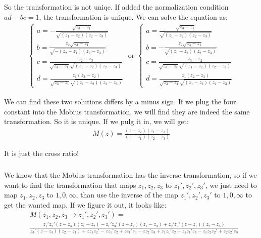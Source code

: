 \documentclass[]{ctexart}
\begin{document}
		So the transformation is not uniqe. If added the normalization condition $ad-bc=1$, the transformation is unique. We can solve the equation as:
			\begin{equation*}
			\begin{aligned}
				\begin{cases}
					a=-\frac{\sqrt{z_3-z_1}}{\sqrt{(z_1-z_2) (z_2-z_3)}}\\
					b=\frac{z_2 \sqrt{z_3-z_1}}{\sqrt{-(z_2-z_1) (z_2-z_3)}}\\
					c=\frac{z_2-z_3}{\sqrt{z_3-z_1} \sqrt{(z_1-z_2) (z_2-z_3)}}\\
					d=\frac{z_1 (z_3-z_2)}{\sqrt{z_3-z_1} \sqrt{(z_1-z_2) (z_2-z_3)}}
				\end{cases}
				\text{ or }
				\begin{cases}
					a=\frac{\sqrt{z_3-z_1}}{\sqrt{(z_1-z_2) (z_2-z_3)}}\\
					b=-\frac{z_2 \sqrt{z_3-z_1}}{\sqrt{(z_1-z_2) (z_2-z_3)}}\\
					c=\frac{z_3-z_2}{\sqrt{z_3-z_1} \sqrt{(z_1-z_2) (z_2-z_3)}}\\
					d=\frac{z_1 (z_2-z_3)}{\sqrt{z_3-z_1} \sqrt{(z_1-z_2) (z_2-z_3)}}
				\end{cases}
			\end{aligned}
			\end{equation*}
			
			We can find these two solutions differs by a minus sign.  If we plug the four constant into the Mobius transformation, we will find they are indeed the same transformation. So it is unique. If we pulg it in, we will get:
				\begin{equation*}
				\begin{aligned}
					M(z)=\frac{(z-z_2)(z_1-z_3)}{(z-z_1)(z_2-z_3)}
				\end{aligned}
				\end{equation*}
			
			It is just the cross ratio!
		\subsubsection{}
			We know that the Mobius transformation has the inverse transformation, so if we want to find the transformation that maps $z_1,z_2,z_3$ to $z_1',z_2',z_3'$, we just need to map $z_1,z_2,z_3$ to $1,0,\infty$, than use the inverse of the map $z_1',z_2',z_3'$ to $1,0,\infty$ to get the wanted map. If we figure it out, it looks like:
				\begin{equation*}
				\begin{aligned}
					&M(z_1,z_2,z_3\rightarrow z_1',z_2',z_3')=\\
					&\frac{z_1' z_2' (z-z_3) (z_1-z_2)-z_1' z_3' (z-z_2) (z_1-z_3)+z_2' z_3' (z-z_1) (z_2-z_3)}{z_3' (z-z_3) (z_2-z_1)+z z_1 z_2'-z z_1' z_2+z z_1' z_3-z z_2' z_3+z_1 z_1' z_2-z_1 z_1' z_3-z_1 z_2 z_2'+z_2 z_2' z_3}
				\end{aligned}
				\end{equation*}
				
\end{document}
